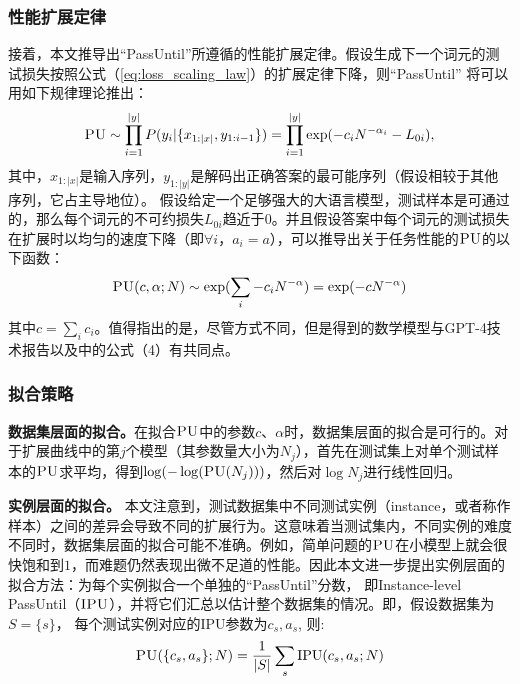 \subsubsection{性能扩展定律}
接着，本文推导出“PassUntil”所遵循的性能扩展定律。假设生成下一个词元的测试损失按照公式（\ref{eq:loss_scaling_law}）的扩展定律下降，则“PassUntil” 将可以用如下规律理论推出：
\begin{equation}
\label{eq:task_scaling_raw}
    \textsc{PU} \sim \prod_{i=1}^{|y|} P(y_i|\{x_{1:|x|}, y_{1:i - 1}\}) = \prod_{i=1}^{|y|} \exp(-{c_i}{{N}^{-\alpha_i}} - L_{0i}),
\end{equation}
其中，$x_{1:|x|}$是输入序列，$y_{1:|y|}$是解码出正确答案的最可能序列（假设相较于其他序列，它占主导地位）。
假设给定一个足够强大的大语言模型，测试样本是可通过的，那么每个词元的不可约损失$L_{0i}$趋近于$0$。并且假设答案中每个词元的测试损失在扩展时以均匀的速度下降（即$\forall i$，$a_i = a$），可以推导出关于任务性能的$\textsc{PU}$的以下函数：
\begin{equation}
\label{eq:exp_scaling}
    \textsc{PU}(c, \alpha; N) \sim \operatorname{exp}(\sum_i -{c_i}{{N}^{-\alpha}} ) = \operatorname{exp}(-{c}{{N}^{-\alpha}})
\end{equation}
其中$c = \sum_i c_i$。值得指出的是，尽管方式不同，但是得到的数学模型与GPT-4技术报告\citep{openai2023gpt4}以及\citet{schaeffer2023emergent}中的公式（4）有共同点。

\subsubsection{拟合策略}
\textbf{数据集层面的拟合。}在拟合$\textsc{PU}$中的参数$c$、$\alpha$时，数据集层面的拟合是可行的。对于扩展曲线中的第$j$个模型（其参数量大小为$N_j$），首先在测试集上对单个测试样本的$\textsc{PU}$求平均，得到$\operatorname{log}(-\operatorname{log}(\textsc{PU}(N_j)))$，然后对$\operatorname{log}N_j$进行线性回归。

\textbf{实例层面的拟合。}
\label{sec:instance_level_pass}
本文注意到，测试数据集中不同测试实例（instance，或者称作样本）之间的差异会导致不同的扩展行为。这意味着当测试集内，不同实例的难度不同时，数据集层面的拟合可能不准确。例如，简单问题的$\textsc{PU}$在小模型上就会很快饱和到$1$，而难题仍然表现出微不足道的性能。因此本文进一步提出实例层面的拟合方法：为每个实例拟合一个单独的“PassUntil”分数， 即Instance-level PassUntil（$\textsc{IPU}$），并将它们汇总以估计整个数据集的情况。即，假设数据集为$S = \{s\}$， 每个测试实例对应的IPU参数为$c_s, a_s$, 则:
\begin{equation}
    {\textsc{PU}}(\{c_s, a_s\}; N) = \frac{1}{|S|}\sum_s {\operatorname{IPU}}(c_s, a_s; N)
\end{equation}


